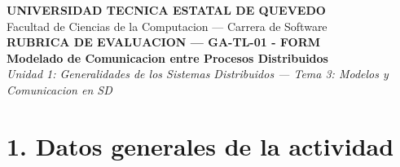 \documentclass[10pt]{article}
\begin{document}
\begin{center}
	{\LARGE\bfseries\color{uteqBlue}UNIVERSIDAD TECNICA ESTATAL DE QUEVEDO}\\[2pt]
	{\normalsize\color{uteqMid}Facultad de Ciencias de la Computacion --- Carrera de Software}\\[6pt]
	{\Large\bfseries\color{uteqBlue}RUBRICA DE EVALUACION --- GA-TL-01 - FORM}\\[3pt]
	{\large\bfseries\color{uteqTeal}Modelado de Comunicacion entre Procesos Distribuidos}\\[2pt]
	{\small\itshape Unidad 1: Generalidades de los Sistemas Distribuidos --- Tema 3: Modelos y Comunicacion en SD}
\end{center}

\vspace{4pt}

\section{1. Datos generales de la actividad}
\end{document}
